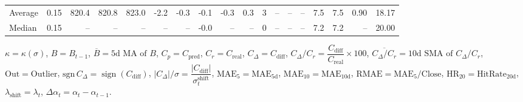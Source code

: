 \begin{threeparttable}
{\begin{tabular}{lrrrrrrrrrrrrrrrrr}
Average &     0.15 & 820.4 & 820.8 & 823.0 &       -2.2 &           -0.3 &                      -0.1 &                     -0.3 &                 0.3 &              3 &         -- &        -- &             -- &              7.5 &                 7.5 &            0.90 &                  18.17 \\
 Median &     0.15 &    -- &    -- &    -- &         -- &             -- &                      -0.0 &                       -- &                  -- &              0 &         -- &        -- &             -- &              7.2 &                 7.2 &              -- &                  20.00 \\
\bottomrule
\end{tabular}
}
\begin{tablenotes}\footnotesize
\item $\kappa=\kappa(\sigma)$, $B=B_{t-1}$, $\overline{B}=\text{5d MA of }B$, $C_p=C_{\text{pred}}$, $C_r=C_{\text{real}}$, $C_\Delta=C_{\text{diff}}$, $C_\Delta/C_r=\dfrac{C_{\text{diff}}}{C_{\text{real}}}\times100$, $\overline{C_\Delta/C_r}=\text{10d SMA of }C_\Delta/C_r$, $\mathrm{Out}=\text{Outlier}$, $\mathrm{sgn}\,C_\Delta=\operatorname{sign}(C_{\text{diff}})$, $|C_\Delta|/\sigma=\dfrac{|C_{\text{diff}}|}{\sigma_t^{\text{shift}}}$, $\mathrm{MAE}_5=\mathrm{MAE}_{5\text{d}}$, $\mathrm{MAE}_{10}=\mathrm{MAE}_{10\text{d}}$, $\mathrm{RMAE}= \mathrm{MAE}_5 / \text{Close}$, $\mathrm{HR}_{20}=\mathrm{HitRate}_{20\text{d}}$, $\lambda_{\text{shift}}=\lambda_t$, $\Delta\alpha_t=\alpha_t-\alpha_{t-1}$.
\end{tablenotes}
\end{threeparttable}
\endgroup

